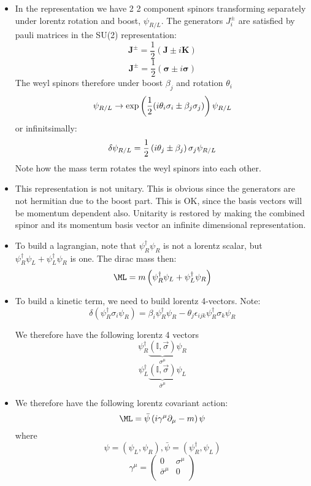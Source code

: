 \documentclass[11pt]{scrartcl}
\begin{document}
\begin{itemize}
\item In the  representation we have 2 2 component spinors transforming separately under lorentz rotation and boost, $\psi_{R/L}$.  The generators $J_{i}^{\pm}$ are satisfied by pauli matrices in the SU(2) representation:
\[\mathbf{J}^{\pm} = \frac12 \left(\mathbf{J} \pm i \mathbf{K} \right) \]
\[\mathbf{J}^{\pm} = \frac12 \left(\mathbf{\sigma} \pm i \mathbf{ \sigma} \right) \]
The weyl spinors therefore under boost $\beta_j$ and rotation $\theta_i$
\[ \psi_{R/L} \rightarrow \exp \left( {1 \over 2} (i \theta_i \sigma_i \pm \beta_j \sigma_j) \right) \psi_{R/L} \]
or infinitsimally:
\[ \delta \psi_{R/L} = {1 \over 2} \left( i \theta_j  \pm \beta_j \right) \sigma_j \psi_{R/L} \]
Note how the mass term rotates the weyl spinors into each other.

\item This representation is not unitary.  This is obvious since the generators are not hermitian due to the boost part.  This is OK, since the basis vectors will be momentum dependent also.  Unitarity is restored by making the combined spinor and its momentum basis vector an infinite dimensional representation.

\item To build a lagrangian, note that $\psi_R^\dagger \psi_R$ is not a lorentz scalar, but 
$\psi_R^\dagger \psi_L + \psi_L^\dagger \psi_R$ is one.
The dirac mass then:
\[ \ML = m \left( \psi_R^\dagger \psi_L + \psi_L^\dagger \psi_R \right) \]
\item To build a kinetic term, we need to build lorentz 4-vectors.
Note: 
\[ \delta (\psi_R^\dagger \sigma_i \psi_R) = \beta_i \psi_R^\dagger \psi_R - \theta_j \epsilon_{ijk} \psi_R^\dagger \sigma_k \psi_R \]

We therefore have the following lorentz 4 vectors
\[ \psi_R^\dagger \underbrace{(\mathbb{I}, \vec{\sigma})}_{\sigma^\mu} \psi_R \]
\[ \psi_L^\dagger \underbrace{(\mathbb{I}, \vec{\sigma})}_{\bar{\sigma}^\mu} \psi_L \]
\item We therefore have the following lorentz covariant action:
\[ \ML = \bar{\psi} \left(i \gamma^\mu \partial_\mu - m \right) \psi \]
where
\[ \psi = (\psi_L, \psi_R), \bar{\psi} = (\psi_R^\dagger, \psi_L) \]
\[ \gamma^\mu = 
\begin{pmatrix}
	0 & \sigma^\mu \\
	\bar{\sigma}^\mu & 0 \\
\end{pmatrix} \]


\end{itemize}
\end{document}
